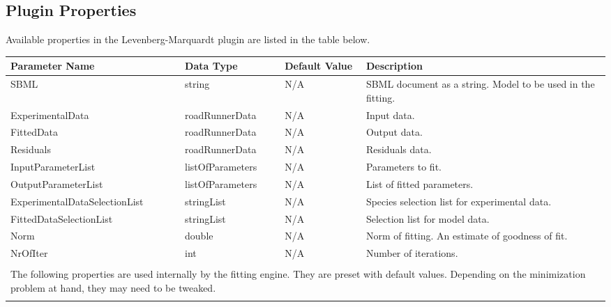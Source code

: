\begin{landscape}
\section{Plugin Properties}
Available properties in the Levenberg-Marquardt plugin are listed in the table below.

\centering %
\begin{longtable}{p{4cm} l p{3cm}  p{10cm}} %

Parameter Name & Data Type & Default Value  & Description \\ [0.5ex] %
\hline %
SBML                            &   string              & N/A    &   SBML document as a string. Model to be used in the fitting. \\
ExperimentalData   				&	roadRunnerData 		& N/A    &   Input data.  \\
FittedData      				& 	roadRunnerData    	& N/A    &   Output data. \\
Residuals     					& 	roadRunnerData    	& N/A    &   Residuals data.  \\
InputParameterList 				&	listOfParameters    & N/A    &   Parameters to fit. \\
OutputParameterList 			&   listOfParameters 	& N/A    &   List of fitted parameters. \\
Experimental\-DataSelectionList & 	stringList			& N/A    &   Species selection list for experimental data. \\
FittedDataSelectionList     	& 	stringList			& N/A    &   Selection list for model data. \\
Norm							&	double				& N/A    &   Norm of fitting. An estimate of goodness of fit. \\
NrOfIter                        &   int                 & N/A    &   Number of iterations. \\[12pt]
\\[2pt]                                                               
\multicolumn{4}{p{19cm}}{The following properties are used internally by the fitting engine. They are preset with default values. Depending on the minimization problem at hand, they may need to be tweaked. } \\[12pt]
\hline %
\\[2pt]                                                               

\end{longtable}
\end{landscape}
